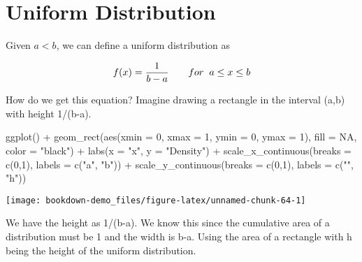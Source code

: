 \documentclass[
]{book}
\newenvironment{Shaded}{\begin{snugshade}}{\end{snugshade}}
\newcommand{\AttributeTok}[1]{\textcolor[rgb]{0.77,0.63,0.00}{#1}}
\newcommand{\ConstantTok}[1]{\textcolor[rgb]{0.00,0.00,0.00}{#1}}
\newcommand{\DecValTok}[1]{\textcolor[rgb]{0.00,0.00,0.81}{#1}}
\newcommand{\FunctionTok}[1]{\textcolor[rgb]{0.00,0.00,0.00}{#1}}
\newcommand{\NormalTok}[1]{#1}
\newcommand{\SpecialCharTok}[1]{\textcolor[rgb]{0.00,0.00,0.00}{#1}}
\newcommand{\StringTok}[1]{\textcolor[rgb]{0.31,0.60,0.02}{#1}}
\begin{document}
\hypertarget{uniform-distribution}{%
\section{Uniform Distribution}\label{uniform-distribution}}

Given \(a < b\), we can define a uniform distribution as

\[ f(x) = \frac{1}{b-a}\hspace{0.7cm}for\hspace{0.2cm}a\leq x\leq b \]

How do we get this equation? Imagine drawing a rectangle in the interval (a,b) with height 1/(b-a).

\begin{Shaded}
\begin{Highlighting}[]
\FunctionTok{ggplot}\NormalTok{() }\SpecialCharTok{+}
  \FunctionTok{geom\_rect}\NormalTok{(}\FunctionTok{aes}\NormalTok{(}\AttributeTok{xmin =} \DecValTok{0}\NormalTok{, }\AttributeTok{xmax =} \DecValTok{1}\NormalTok{, }\AttributeTok{ymin =} \DecValTok{0}\NormalTok{, }\AttributeTok{ymax =} \DecValTok{1}\NormalTok{), }\AttributeTok{fill =} \ConstantTok{NA}\NormalTok{, }\AttributeTok{color =} \StringTok{"black"}\NormalTok{) }\SpecialCharTok{+}
  \FunctionTok{labs}\NormalTok{(}\AttributeTok{x =} \StringTok{"x"}\NormalTok{, }\AttributeTok{y =} \StringTok{"Density"}\NormalTok{) }\SpecialCharTok{+}
  \FunctionTok{scale\_x\_continuous}\NormalTok{(}\AttributeTok{breaks =} \FunctionTok{c}\NormalTok{(}\DecValTok{0}\NormalTok{,}\DecValTok{1}\NormalTok{), }\AttributeTok{labels =} \FunctionTok{c}\NormalTok{(}\StringTok{"a"}\NormalTok{, }\StringTok{"b"}\NormalTok{)) }\SpecialCharTok{+}
  \FunctionTok{scale\_y\_continuous}\NormalTok{(}\AttributeTok{breaks =} \FunctionTok{c}\NormalTok{(}\DecValTok{0}\NormalTok{,}\DecValTok{1}\NormalTok{), }\AttributeTok{labels =} \FunctionTok{c}\NormalTok{(}\StringTok{""}\NormalTok{, }\StringTok{"h"}\NormalTok{))}
\end{Highlighting}
\end{Shaded}

\begin{center}\texttt{[image: bookdown-demo\_files/figure-latex/unnamed-chunk-64-1]} \end{center}

We have the height as 1/(b-a). We know this since the cumulative area of a distribution must be 1 and the width is b-a. Using the area of a rectangle with h being the height of the uniform distribution.
\end{document}
